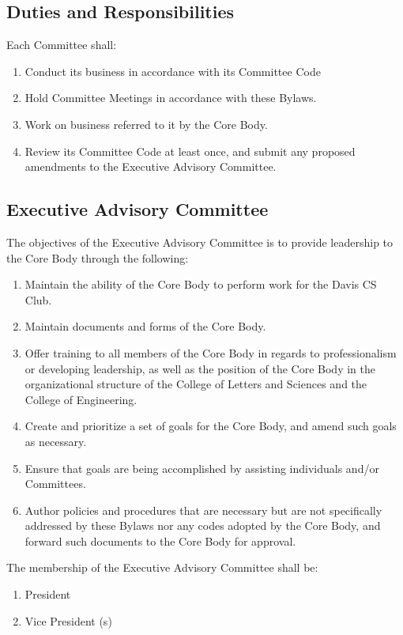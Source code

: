 \documentclass{article}
\newenvironment{li}{
\begin{enumerate}
  \setlength{\itemsep}{1pt}
  \setlength{\parskip}{0pt}
  \setlength{\parsep}{0pt}
}{\end{enumerate}}
\begin{document}
\subsection{Duties and Responsibilities}
Each Committee shall:
\begin{li}
\item Conduct its business in accordance with its Committee Code
\item Hold Committee Meetings in accordance with these Bylaws.
\item Work on business referred to it by the Core Body.
\item Review its Committee Code at least once, and submit any proposed amendments to the Executive Advisory Committee.
\end{li}


\subsection{Executive Advisory Committee}
The objectives of the Executive Advisory Committee is to provide leadership to the Core Body through the following:
\begin{li}
\item Maintain the ability of the Core Body to perform work for the Davis CS Club.
\item Maintain documents and forms of the Core Body.
\item Offer training to all members of the Core Body in regards to professionalism or developing leadership, as well as the position of the Core Body in the organizational structure of the College of Letters and Sciences and the College of Engineering.
\item Create and prioritize a set of goals for the Core Body, and amend such goals as necessary.
\item Ensure that goals are being accomplished by assisting individuals and/or Committees.
\item Author policies and procedures that are necessary but are not specifically addressed by these Bylaws nor any codes adopted by the Core Body, and forward such documents to the Core Body for approval.
\end{li}

\noindent The membership of the Executive Advisory Committee shall be:
\begin{li}
\item President
\item Vice President (s)
\end{li}
\end{document}

